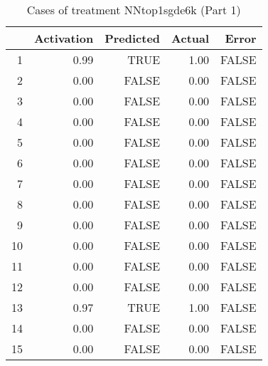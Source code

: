 \begin{table}[ht]
\centering
\begin{tabular}{rrrrr}
  \hline
 & Activation & Predicted & Actual & Error \\ 
  \hline
1 & 0.99 & TRUE & 1.00 & FALSE \\ 
  2 & 0.00 & FALSE & 0.00 & FALSE \\ 
  3 & 0.00 & FALSE & 0.00 & FALSE \\ 
  4 & 0.00 & FALSE & 0.00 & FALSE \\ 
  5 & 0.00 & FALSE & 0.00 & FALSE \\ 
  6 & 0.00 & FALSE & 0.00 & FALSE \\ 
  7 & 0.00 & FALSE & 0.00 & FALSE \\ 
  8 & 0.00 & FALSE & 0.00 & FALSE \\ 
  9 & 0.00 & FALSE & 0.00 & FALSE \\ 
  10 & 0.00 & FALSE & 0.00 & FALSE \\ 
  11 & 0.00 & FALSE & 0.00 & FALSE \\ 
  12 & 0.00 & FALSE & 0.00 & FALSE \\ 
  13 & 0.97 & TRUE & 1.00 & FALSE \\ 
  14 & 0.00 & FALSE & 0.00 & FALSE \\ 
  15 & 0.00 & FALSE & 0.00 & FALSE \\ 
   \hline
\end{tabular}
\caption{Cases of treatment NNtop1sgde6k (Part 1)} 
\end{table}
